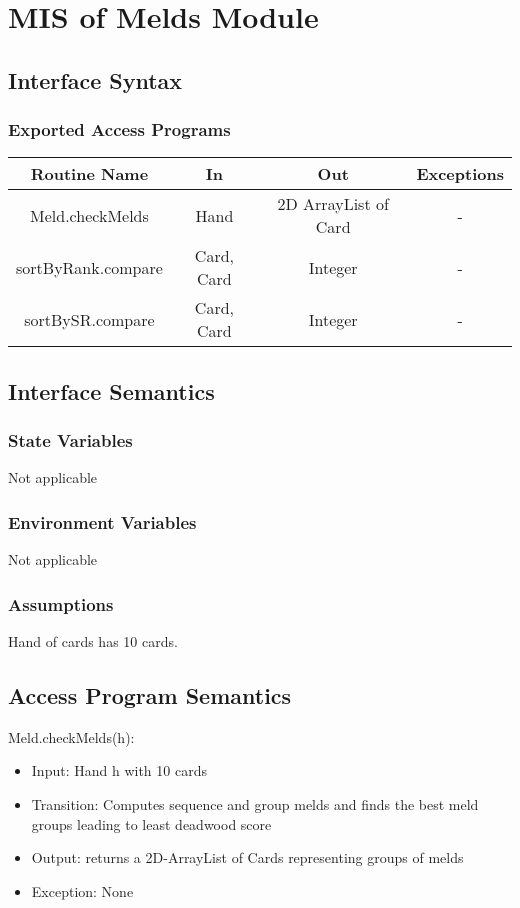 \documentclass[12pt, titlepage]{article}
\begin{document}
\section{MIS of Melds Module}

\subsection{Interface Syntax}
\subsubsection{Exported Access Programs}
\begin{tabular}[pos]{|c|c|c|c|}
	\hline
	\textbf{Routine Name}& \textbf{In} & \textbf{Out} & \textbf{Exceptions} \\ \hline
	Meld.checkMelds & Hand & 2D ArrayList of Card &  - \\\hline
	sortByRank.compare & Card, Card & Integer &  - \\\hline
	sortBySR.compare & Card, Card & Integer &  - \\\hline
\end{tabular}

\subsection{Interface Semantics}

\subsubsection{State Variables}
Not applicable

\subsubsection{Environment Variables}
Not applicable

\subsubsection{Assumptions}
Hand of cards has 10 cards. 

\subsection{Access Program Semantics}
\noindent Meld.checkMelds(h):
\begin{itemize}
    \item Input: Hand h with 10 cards
    \item Transition: Computes sequence and group melds and finds the best meld groups leading to least deadwood score
    \item Output: returns a 2D-ArrayList of Cards representing groups of melds
    \item Exception: None
\end{itemize}
\end{document}

